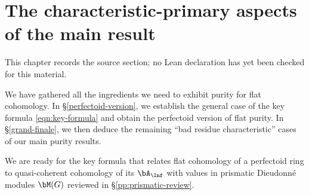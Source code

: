 \chapter{The characteristic-primary aspects of the main result}
\label{purity-flat-cohomology-chapter-06}

\begin{remark}
\label{purity-flat-cohomology-chapter-06-source}
This chapter records the source section; no Lean declaration has yet been checked for this material.
\notready
\end{remark}

\label{bad-characteristics}






We have gathered all the ingredients we need to exhibit purity for flat cohomology.
 In \S\ref{perfectoid-version}, we establish the general case of the key formula \eqref{eqn:key-formula} and obtain the perfectoid version of flat purity. In \S\ref{grand-finale}, we then deduce the remaining ``bad residue characteristic'' cases of our main purity results.%













 \label{perfectoid-version}


We are ready for the key formula that relates flat cohomology of a perfectoid ring to quasi-coherent cohomology of its $\bA_\Inf$ with values in prismatic Dieudonn\'{e} modules $\bM(G)$ reviewed in \S\ref{pp:prismatic-review}. %


